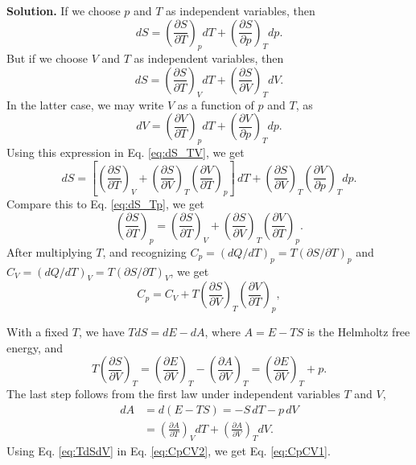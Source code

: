 \documentclass[twocolumn, 10pt]{article}
\numberwithin{equation}{section}
\newenvironment{solution}
{\par\medskip
  \textbf{Solution. }\ignorespaces}
{\medskip}
\begin{document}
\begin{solution}
If we choose $p$ and $T$ as independent variables, then
\begin{equation}
  dS =
  \left( \frac{ \partial S } { \partial T } \right)_p dT
  +
  \left( \frac{ \partial S } { \partial p } \right)_T dp.
  \label{eq:dS_Tp}
\end{equation}
But if we choose $V$ and $T$ as independent variables, then
\begin{equation}
  dS =
  \left( \frac{ \partial S } { \partial T } \right)_V dT
  +
  \left( \frac{ \partial S } { \partial V } \right)_T dV.
  \label{eq:dS_TV}
\end{equation}
In the latter case,
we may write $V$ as a function of $p$ and $T$, as
$$
  dV =
  \left( \frac{ \partial V } { \partial T } \right)_p dT
  +
  \left( \frac{ \partial V } { \partial p } \right)_T dp.
$$
Using this expression in Eq. \eqref{eq:dS_TV}, we get
$$
  dS =
  \left[
  \left( \frac{ \partial S } { \partial T } \right)_V
  +
  \left( \frac{ \partial S } { \partial V } \right)_T
  \left( \frac{ \partial V } { \partial T } \right)_p
  \right] \, dT
  +
  \left( \frac{ \partial S } { \partial V } \right)_T
  \left( \frac{ \partial V } { \partial p } \right)_T dp.
$$
Compare this to Eq. \eqref{eq:dS_Tp}, we get
$$
  \left( \frac{ \partial S } { \partial T } \right)_p
  =
  \left( \frac{ \partial S } { \partial T } \right)_V
  +
  \left( \frac{ \partial S } { \partial V } \right)_T
  \left( \frac{ \partial V } { \partial T } \right)_p.
$$
After multiplying $T$,
  and recognizing
  $C_p = (dQ/dT)_p = T (\partial S/\partial T)_p$
  and
  $C_V = (dQ/dT)_V = T (\partial S/\partial T)_V$,
  we get
\begin{equation}
  C_p
  =
  C_V
  +
  T \left( \frac{ \partial S } { \partial V } \right)_T
  \left( \frac{ \partial V } { \partial T } \right)_p,
  \label{eq:CpCV2}
\end{equation}

With a fixed $T$, we have $T dS = dE - dA$,
where $A = E - TS$ is the Helmholtz free energy, and
\begin{equation}
  T \left( \frac{ \partial S } { \partial V } \right)_T
  =
  \left( \frac{ \partial E } { \partial V } \right)_T
  -
  \left( \frac{ \partial A } { \partial V } \right)_T
  =
  \left( \frac{ \partial E } { \partial V } \right)_T
  +p.
  \label{eq:TdSdV}
\end{equation}
The last step follows from
the first law under independent variables $T$ and $V$,
\begin{align*}
  dA
  &= d(E - TS) = -S \, dT - p \, dV
  \\
  &=
  \left( \frac{ \partial A } { \partial T } \right)_V dT
  +
  \left( \frac{ \partial A } { \partial V } \right)_T dV
  .
\end{align*}
Using Eq. \eqref{eq:TdSdV} in Eq. \eqref{eq:CpCV2},
we get Eq. \eqref{eq:CpCV1}.


\end{solution}
\end{document}
